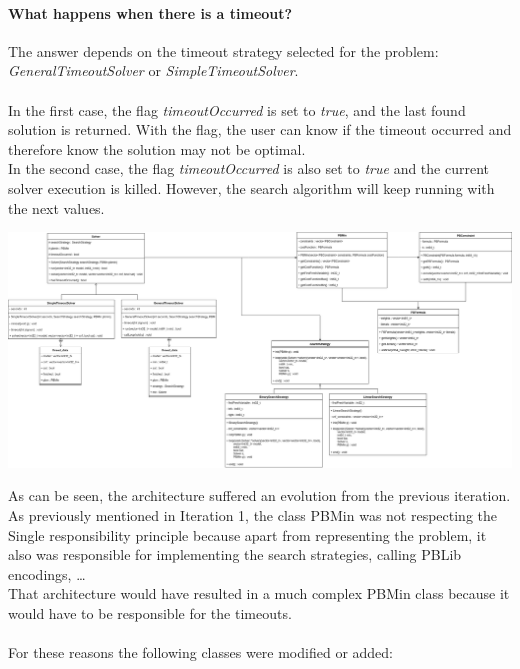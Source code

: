 \paragraph{What happens when there is a timeout?\\}
The answer depends on the timeout strategy selected for the problem: \emph{GeneralTimeoutSolver} or \emph{SimpleTimeoutSolver}. \\\\
In the first case, the flag \emph{timeoutOccurred} is set to \emph{true}, and the last found solution is returned. With the flag, the user can know if the timeout occurred and therefore know the solution may not be optimal.  \\
In the second case, the flag \emph{timeoutOccurred} is also set to \emph{true} and the current solver execution is killed. However, the search algorithm will keep running with the next values.  
\begin{center}
	\includegraphics[width=1.6\textwidth, angle=90]{Figures/Iteration_2_Architecture-UML.png}
	\label{it2arch}
\end{center}
\label{arch-error}
As can be seen, the architecture suffered an evolution from the previous iteration. As previously mentioned in Iteration 1, the class PBMin was not respecting the Single responsibility principle because apart from representing the problem, it also was responsible for implementing the search strategies, calling PBLib encodings, \ldots \\ 
That architecture would have resulted in a much complex PBMin class because it would have to be responsible for the timeouts.  \\\\
For these reasons the following classes were modified or added: 
